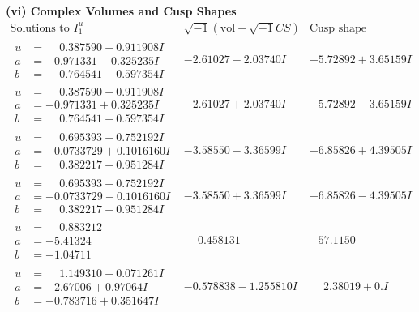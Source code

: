 \documentclass[1p]{elsarticle_modified}
\theoremstyle{definition}
\newcommand{\I}{\sqrt{-1}}
\begin{document}
\newpage\flushleft \textbf{(vi) Complex Volumes and Cusp Shapes}
$$\begin{array}{c|c|c}  
\text{Solutions to }I^u_{1}& \I (\text{vol} + \sqrt{-1}CS) & \text{Cusp shape}\\
 \hline 
\begin{aligned}
u &= \phantom{-}0.387590 + 0.911908 I \\
a &= -0.971331 - 0.325235 I \\
b &= \phantom{-}0.764541 - 0.597354 I\end{aligned}
 & -2.61027 - 2.03740 I & -5.72892 + 3.65159 I \\ \hline\begin{aligned}
u &= \phantom{-}0.387590 - 0.911908 I \\
a &= -0.971331 + 0.325235 I \\
b &= \phantom{-}0.764541 + 0.597354 I\end{aligned}
 & -2.61027 + 2.03740 I & -5.72892 - 3.65159 I \\ \hline\begin{aligned}
u &= \phantom{-}0.695393 + 0.752192 I \\
a &= -0.0733729 + 0.1016160 I \\
b &= \phantom{-}0.382217 + 0.951284 I\end{aligned}
 & -3.58550 - 3.36599 I & -6.85826 + 4.39505 I \\ \hline\begin{aligned}
u &= \phantom{-}0.695393 - 0.752192 I \\
a &= -0.0733729 - 0.1016160 I \\
b &= \phantom{-}0.382217 - 0.951284 I\end{aligned}
 & -3.58550 + 3.36599 I & -6.85826 - 4.39505 I \\ \hline\begin{aligned}
u &= \phantom{-}0.883212\phantom{ +0.000000I} \\
a &= -5.41324\phantom{ +0.000000I} \\
b &= -1.04711\phantom{ +0.000000I}\end{aligned}
 & \phantom{-}0.458131\phantom{ +0.000000I} & -57.1150\phantom{ +0.000000I} \\ \hline\begin{aligned}
u &= \phantom{-}1.149310 + 0.071261 I \\
a &= -2.67006 + 0.97064 I \\
b &= -0.783716 + 0.351647 I\end{aligned}
 & -0.578838 - 1.255810 I & \phantom{-}2.38019 + 0. I\phantom{ +0.000000I} \\ \hline\begin{aligned}

\end{aligned}
\end{array}$$
\end{document}
